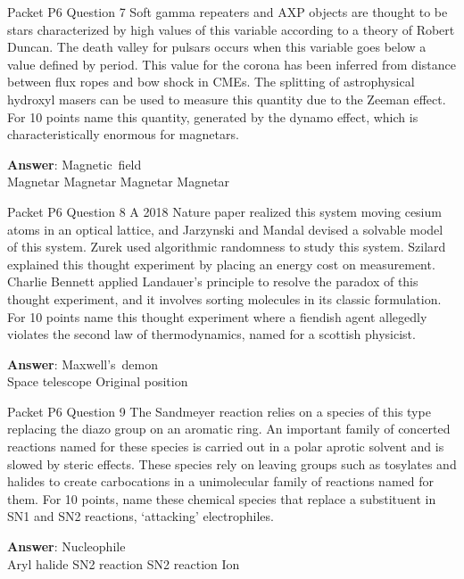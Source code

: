 \begin{frame}{Packet P6 Question 7}
Soft gamma repeaters and     AXP objects are thought   to be stars characterized by high values of this variable according to a theory of Robert Duncan. The death valley for pulsars occurs when this variable goes below a value defined by period. This value for the corona has been inferred from distance between flux ropes and bow shock in CMEs. The splitting of astrophysical hydroxyl masers can be used to measure this quantity due to the Zeeman effect. For 10 points name this quantity, generated by the dynamo effect, which is characteristically enormous for magnetars.  

\textbf{Answer}: Magnetic\ field\\
 Magnetar
 Magnetar
 Magnetar
 Magnetar
\end{frame}

\begin{frame}{Packet P6 Question 8}
A 2018 Nature paper realized   this system moving cesium atoms in an optical lattice, and Jarzynski and Mandal devised a solvable model of this system. Zurek used algorithmic randomness to study this system. Szilard explained this thought experiment   by placing an energy cost on measurement. Charlie Bennett applied Landauer’s principle to resolve   the paradox of this thought experiment, and it involves sorting molecules in its classic formulation. For 10 points name this thought experiment   where a fiendish agent allegedly violates the second law of thermodynamics,     named for a scottish physicist.

\textbf{Answer}: Maxwell's\ demon\\
 Space telescope
 Original position
\end{frame}

\begin{frame}{Packet P6 Question 9}
The Sandmeyer reaction relies on a species of this type replacing the diazo group on an aromatic ring. An important family of concerted reactions named for these   species is carried out in a polar aprotic solvent and is slowed by steric effects.   These species rely on leaving groups such as tosylates and halides to create   carbocations in a unimolecular family of reactions named for them. For 10 points, name these chemical species that replace   a substituent in SN1 and SN2 reactions, ‘attacking’ electrophiles.

\textbf{Answer}: Nucleophile\\
 Aryl halide
 SN2 reaction
 SN2 reaction
 Ion
\end{frame}


